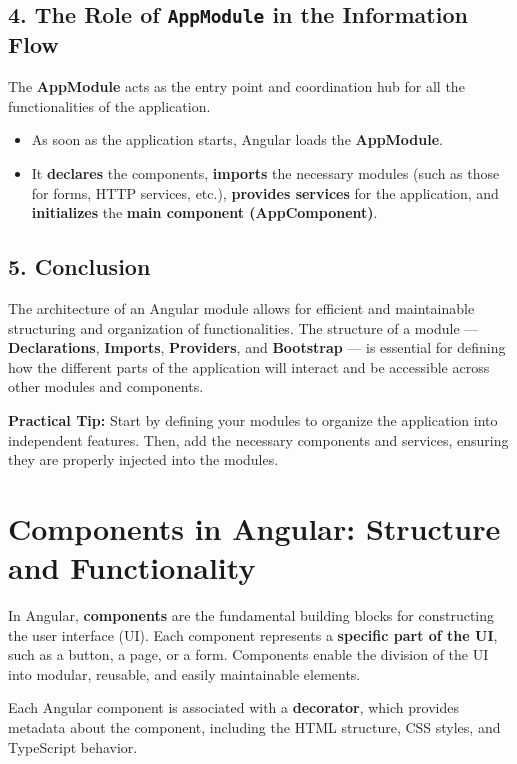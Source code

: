 \documentclass{article}
\begin{document}
\subsection*{4. The Role of \texttt{AppModule} in the Information Flow}

The \textbf{AppModule} acts as the entry point and coordination hub for all the functionalities of the application.  
\begin{itemize}
    \item As soon as the application starts, Angular loads the \textbf{AppModule}.
    \item It \textbf{declares} the components, \textbf{imports} the necessary modules (such as those for forms, HTTP services, etc.), \textbf{provides services} for the application, and \textbf{initializes} the \textbf{main component (AppComponent)}.
\end{itemize}

\subsection*{5. Conclusion}

The architecture of an Angular module allows for efficient and maintainable structuring and organization of functionalities. The structure of a module — \textbf{Declarations}, \textbf{Imports}, \textbf{Providers}, and \textbf{Bootstrap} — is essential for defining how the different parts of the application will interact and be accessible across other modules and components.

\textbf{Practical Tip:} Start by defining your modules to organize the application into independent features. Then, add the necessary components and services, ensuring they are properly injected into the modules.

\section*{Components in Angular: Structure and Functionality}

In Angular, \textbf{components} are the fundamental building blocks for constructing the user interface (UI). Each component represents a \textbf{specific part of the UI}, such as a button, a page, or a form. Components enable the division of the UI into modular, reusable, and easily maintainable elements.

Each Angular component is associated with a \textbf{\@Component decorator}, which provides metadata about the component, including the HTML structure, CSS styles, and TypeScript behavior.
\end{document}
